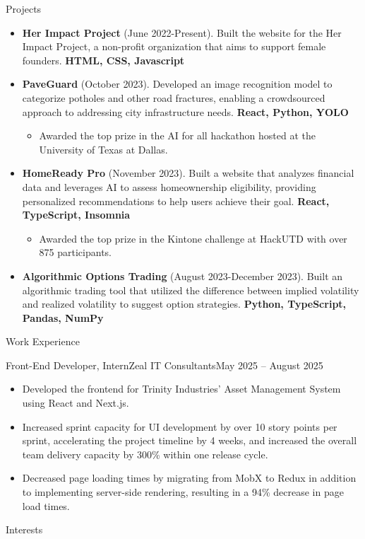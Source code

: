 \documentclass[]{mcdowellcv}
\begin{document}
	\begin{cvsection}{Projects}
		\begin{cvsubsection}{}{}{}	
			\begin{itemize}
				\item \textbf{Her Impact Project} (June 2022-Present).  Built the website for the Her Impact Project, a non-profit organization that aims to support female founders. \textbf{HTML, CSS, Javascript}
				\item \textbf{PaveGuard} (October 2023). Developed an image recognition model to categorize potholes and other road fractures, enabling a crowdsourced approach to addressing city infrastructure needs. \textbf{React, Python, YOLO}
				\begin{itemize}
					\item Awarded the top prize in the AI for all hackathon hosted at the University of Texas at Dallas.
				\end{itemize}
				\item \textbf{HomeReady Pro} (November 2023). Built a website that analyzes financial data and leverages AI to assess homeownership eligibility, providing personalized recommendations to help users achieve their goal. \textbf{React, TypeScript, Insomnia}
				\begin{itemize}
				\item Awarded the top prize in the Kintone challenge at HackUTD with over 875 participants.
				\end{itemize}
				\item \textbf{Algorithmic Options Trading} (August 2023-December 2023). Built an algorithmic trading tool that utilized the difference between implied volatility and realized volatility to suggest option strategies. \textbf{Python, TypeScript, Pandas, NumPy}
			\end{itemize}
		\end{cvsubsection}
	\end{cvsection}
		\begin{cvsection}{Work Experience}
		\begin{cvsubsection}{Front-End Developer, Intern}{Zeal IT Consultants}{May 2025 -- August 2025}			
			\begin{itemize}
				\item Developed the frontend for Trinity Industries' Asset Management System using React and Next.js.
				\item Increased sprint capacity for UI development by over 10 story points per sprint, accelerating the project timeline by 4 weeks, and increased the overall team delivery capacity by 300\% within one release cycle.
				\item Decreased page loading times by migrating from MobX to Redux in addition to implementing server-side rendering, resulting in a 94\% decrease in page load times.
			\end{itemize}
		\end{cvsubsection}
	\end{cvsection}

	\begin{cvsection}{Interests}
		\begin{cvsubsection}{}{}{}			
		\end{cvsubsection}
	\end{cvsection}

	
\end{document}
